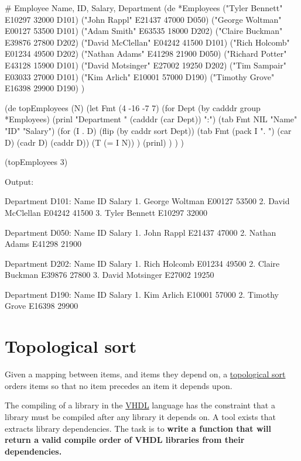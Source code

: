 \begin{wideverbatim}

# Employee Name, ID, Salary, Department
(de *Employees
   ("Tyler Bennett" E10297 32000 D101)
   ("John Rappl" E21437 47000 D050)
   ("George Woltman" E00127 53500 D101)
   ("Adam Smith" E63535 18000 D202)
   ("Claire Buckman" E39876 27800 D202)
   ("David McClellan" E04242 41500 D101)
   ("Rich Holcomb" E01234 49500 D202)
   ("Nathan Adams" E41298 21900 D050)
   ("Richard Potter" E43128 15900 D101)
   ("David Motsinger" E27002 19250 D202)
   ("Tim Sampair" E03033 27000 D101)
   ("Kim Arlich" E10001 57000 D190)
   ("Timothy Grove" E16398 29900 D190) )

(de topEmployees (N)
   (let Fmt (4 -16 -7 7)
      (for Dept (by cadddr group *Employees)
         (prinl "Department " (cadddr (car Dept)) ":")
         (tab Fmt NIL "Name" "ID" "Salary")
         (for (I . D) (flip (by caddr sort Dept))
            (tab Fmt (pack I ". ") (car D) (cadr D) (caddr D))
            (T (= I N)) )
         (prinl) ) ) )

(topEmployees 3)

Output:

Department D101:
    Name            ID      Salary
 1. George Woltman  E00127   53500
 2. David McClellan E04242   41500
 3. Tyler Bennett   E10297   32000

Department D050:
    Name            ID      Salary
 1. John Rappl      E21437   47000
 2. Nathan Adams    E41298   21900

Department D202:
    Name            ID      Salary
 1. Rich Holcomb    E01234   49500
 2. Claire Buckman  E39876   27800
 3. David Motsinger E27002   19250

Department D190:
    Name            ID      Salary
 1. Kim Arlich      E10001   57000
 2. Timothy Grove   E16398   29900

\end{wideverbatim}

\pagebreak{}
\section*{Topological sort}

Given a mapping between items, and items they depend on, a
\href{http://en.wikipedia.org/wiki/Topological\_sorting}{topological
sort} orders items so that no item precedes an item it depends upon.

The compiling of a library in the
\href{http://en.wikipedia.org/wiki/VHDL}{VHDL} language has the
constraint that a library must be compiled after any library it depends
on. A tool exists that extracts library dependencies. The task is to
\textbf{write a function that will return a valid compile order of VHDL
libraries from their dependencies.}

